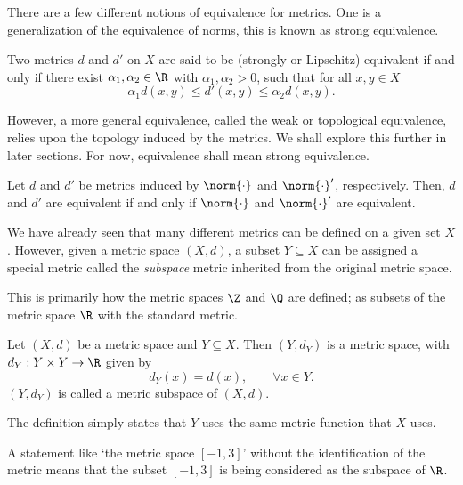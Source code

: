 \documentclass[draft]{penrose}
\begin{document}
There are a few different notions of equivalence for metrics. One is a generalization of the equivalence of norms, this is known as strong equivalence.
\begin{ndfn}
  Two metrics $d$ and $d'$ on $X$ are said to be (strongly or Lipschitz) equivalent if and only if there exist $\alpha_1, \alpha_2 \in \R$ with $\alpha_1, \alpha_2 > 0$, such that for all $x,y \in X$
  \begin{equation*}
    \alpha_1 d(x,y) \leq d'(x,y) \leq \alpha_2 d(x,y).
  \end{equation*}
\end{ndfn}
However, a more general equivalence, called the weak or topological equivalence, relies upon the topology induced by the metrics. We shall explore this further in later sections. For now, equivalence shall mean strong equivalence.

\begin{nlemma}
  Let $d$ and $d'$ be metrics induced by $\norm{\cdot}$ and $\norm{\cdot}'$, respectively. Then, $d$ and $d'$ are equivalent if and only if $\norm{\cdot}$ and $\norm{\cdot}'$ are equivalent.
\end{nlemma}

We have already seen that many different metrics can be defined on a given set $X$. However, given a metric space $(X,d)$, a subset $Y \subseteq X$ can be assigned a special metric called the \emph{subspace} metric inherited from the original metric space.

This is primarily how the metric spaces $\Z$ and $\Q$ are defined; as subsets of the metric space $\R$ with the standard metric.
\begin{nthm}
  Let $(X,d)$ be a metric space and $Y \subseteq X$. Then $(Y,d_Y)$ is a metric space, with $d_Y : Y \times Y \to \R$ given by
  \begin{equation*}
    d_{Y}(x) = d(x), \qquad \forall x \in Y.
  \end{equation*}
  $(Y, d_Y)$ is called a metric subspace of $(X,d)$.
\end{nthm}
The definition simply states that $Y$ uses the same metric function that $X$ uses.

\begin{remark}
  A statement like `the metric space $[-1,3]$' without the identification of the metric means that the subset $[-1,3]$ is being considered as the subspace of $\R$.
\end{remark}
\end{document}
